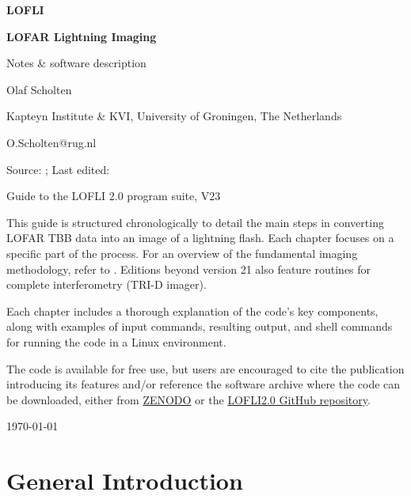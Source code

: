 \documentclass[fleqn,11pt, A4paper]{book}
\newcommand*{\FileDate}[1]{\expandafter\filedateX\pdffilemoddate{#1}\relax}
\def\filedateX#1#2#3#4#5#6#7#8{%
\filedateXX{#3#4#5#6}{#7#8}}
\def\filedateXX#1#2#3#4#5#6#7#8{%
\filedateXXX{#1}{#2}{#3#4}{#5#6}{#7#8}}
\def\filedateXXX#1#2#3#4#5#6#7#8\relax{\formatdate{#1}{#2}{#3}{#4}{#5}{#6#7}}
\newcommand*{\formatdate}[6]{#1-#2-#3\ #4:#5:#6}
\begin{document}
\centerline{\LARGE \bf LOFLI}\vspace{2ex}
\centerline{\Large \bf LOFAR Lightning Imaging}\vspace{2ex}
\centerline{\Large Notes \& software description}\vspace{2ex}
\centerline{Olaf Scholten}\vspace{2ex}
\centerline{Kapteyn Institute \& KVI, University of Groningen, The Netherlands}\vspace{2ex}
\centerline{O.Scholten@rug.nl}\vspace{2ex}
\centerline{Source: \texttt{\jobname}; \hspace{3ex}
Last edited: \FileDate{\jobname.tex} }\vspace{15ex}
\centerline{\Large  Guide to the LOFLI 2.0 program suite, V23}


\newpage

\vspace{2ex}
This guide is structured chronologically to detail the main steps in converting LOFAR TBB data into an image of a lightning flash. Each chapter focuses on a specific part of the process. For an overview of the fundamental imaging methodology, refer to \cite{Scholten:2021-init}. Editions beyond version 21 also feature routines for complete interferometry (TRI-D imager).

Each chapter includes a thorough explanation of the code's key components, along with examples of input commands, resulting output, and shell commands for running the code in a Linux environment.

The code is available for free use, but users are encouraged to cite the publication introducing its features and/or reference the software archive where the code can be downloaded, either from \href{https://zenodo.org/records/4707495}{ZENODO} or the \href{https://github.com/OlafScholten/LOFLI/tree/LOFLI2.0}{LOFLI2.0 GitHub repository}.

\newpage

\tableofcontents


\hfill \today

\chapter{General Introduction}
\end{document}
